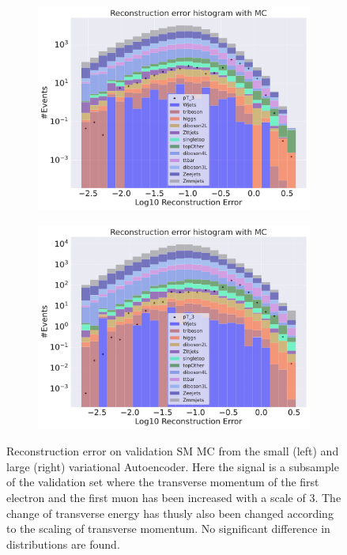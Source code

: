 \begin{figure}[h!]
    \centering
    \begin{subfigure}{.45\textwidth}
        \includegraphics[width=\textwidth]{Figures/VAE_testing/small/b_data_recon_big_rm3_feats_sig_pT_3.pdf}
        \caption{ }
        \label{fig:VAE_small_pt_3}
    \end{subfigure}
    \hfill 
    \begin{subfigure}{.45\textwidth}
        \includegraphics[width=\textwidth]{Figures/VAE_testing/big/b_data_recon_big_rm3_feats_sig_pT_3.pdf}
        \caption{ }
        \label{fig:VAE_big_pt_3}
    \end{subfigure}
    \hfill 
    \caption[VAE | Reconstruction error $p_T$ altering of 3]{Reconstruction error on validation SM MC from the small (left) and large (right) variational Autoencoder. Here the signal is a subsample of the validation 
    set where the transverse momentum of the first electron and the first muon has been increased with a scale of $3$. The change of transverse 
    energy has thusly also been changed according to the scaling of transverse momentum. No significant difference in distributions are found.}
    \label{fig:VAE_big_small_pt_3}
\end{figure}


